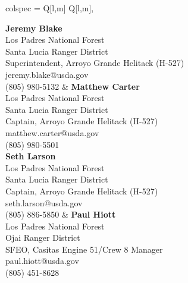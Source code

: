 \documentclass[a4paper,9pt]{extarticle}
\begin{document}
\begin{center}
\begin{tblr}{
    colspec = {Q[l,m] Q[l,m]},
}

{
\textbf{Jeremy Blake} \\
Los Padres National Forest \\
Santa Lucia Ranger District \\
Superintendent, Arroyo Grande Helitack (H-527) \\
jeremy.blake@usda.gov \\
(805) 980-5132
}
&
{
\textbf{Matthew Carter} \\
Los Padres National Forest \\
Santa Lucia Ranger District \\
Captain, Arroyo Grande Helitack (H-527) \\
matthew.carter@usda.gov \\
(805) 980-5501
} \\

{
\textbf{Seth Larson} \\
Los Padres National Forest \\
Santa Lucia Ranger District \\
Captain, Arroyo Grande Helitack (H-527) \\
seth.larson@usda.gov \\
(805) 886-5850
}
&
{
\textbf{Paul Hiott} \\
Los Padres National Forest \\
Ojai Ranger District \\
SFEO, Casitas Engine 51/Crew 8 Manager \\
paul.hiott@usda.gov \\
(805) 451-8628
}

\end{tblr}
\end{center}
\end{document}
